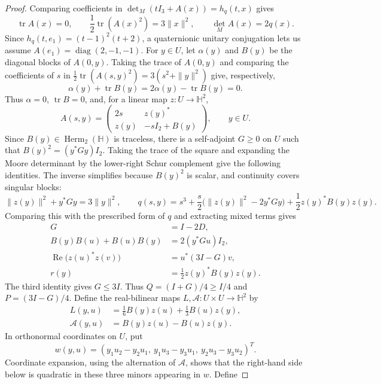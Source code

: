 \documentclass[10pt,a4paper]{amsart}
\newcommand{\tr}{\operatorname{tr}}
\begin{document}
\begin{proof}
Comparing coefficients in $\det_M(tI_3+A(x))=h_q(t,x)$ gives
\[
 \tr A(x)=0,\qquad
 \frac12\tr(A(x)^2)=3\|x\|^2,
 \qquad \det_M A(x)=2q(x).
\]
Since $h_q(t,e_1)=(t-1)^2(t+2)$, a quaternionic unitary conjugation
lets us assume $A(e_1)=\operatorname{diag}(2,-1,-1)$.
For $y\in U$, let $\alpha(y)$ and $B(y)$ be the diagonal blocks of
$A(0,y)$.  Taking the trace of $A(0,y)$ and comparing the coefficients
of $s$ in $\frac12\tr(A(s,y)^2)=3(s^2+\|y\|^2)$ give, respectively,
$$\alpha(y)+\tr B(y)=2\alpha(y)-\tr B(y)=0.$$
Thus $\alpha=0$, $\tr B=0$, and, for a linear map $z\colon U\to\mathbb H^2$,
\[
 A(s,y)=
 \begin{pmatrix}
  2s&z(y)^*\\
  z(y)&-sI_2+B(y)
 \end{pmatrix},
 \qquad y\in U.
\]
Since $B(y)\in\operatorname{Herm}_2(\mathbb H)$ is traceless, there is a
self-adjoint $G\geqslant0$ on $U$ such that
$B(y)^2=(y^*Gy)I_2$.  Taking the trace of the square and expanding the
Moore determinant by the lower-right Schur complement give the following
identities.  The inverse simplifies because $B(y)^2$ is scalar, and
continuity covers singular blocks:
\[
 \|z(y)\|^2+y^*Gy=3\|y\|^2,
 \qquad
 q(s,y)=s^3+\frac{s}{2}
 \bigl(\|z(y)\|^2-2y^*Gy\bigr)
 +\frac12z(y)^*B(y)z(y).
\]
Comparing this with the prescribed form of $q$ and extracting mixed terms gives
\begin{equation}\label{eq:defect-identities}
 \begin{aligned}
 G&=I-2D,\\
 B(y)B(u)+B(u)B(y)&=2(y^*Gu)I_2,\\
 \operatorname{Re}\bigl(z(u)^*z(v)\bigr)
   &=u^*(3I-G)v,\\
 r(y)&=\frac12z(y)^*B(y)z(y).
 \end{aligned}
\end{equation}
The third identity gives $G\leqslant3I$.  Thus
$Q=(I+G)/4\geqslant I/4$ and $P=(3I-G)/4$.
Define the real-bilinear maps $L,\mathcal A\colon U\times U\to\mathbb H^2$ by
\[
 \begin{aligned}
 L(y,u)&=\frac16B(y)z(u)+\frac13B(u)z(y),\\
 \mathcal A(y,u)&=B(y)z(u)-B(u)z(y).
 \end{aligned}
\]
In orthonormal coordinates on $U$, put
\[
 w(y,u)=(y_1u_2-y_2u_1,\ y_1u_3-y_3u_1,\ y_2u_3-y_3u_2)^T.
\]
Coordinate expansion, using the alternation of $\mathcal A$, shows that
the right-hand side below is quadratic in these three minors appearing in $w$.  Define

\end{proof}
\end{document}
